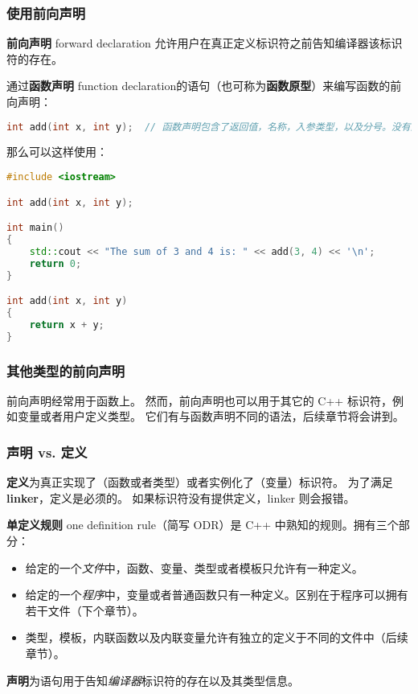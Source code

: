 \documentclass[../../LearnCpp.tex]{subfiles}
\begin{document}

\subsubsection*{使用前向声明}

\textbf{前向声明} forward declaration 允许用户在真正定义标识符之前告知编译器该标识符的存在。

通过\textbf{函数声明} function declaration的语句（也可称为\textbf{函数原型}）来编写函数的前向声明：

\begin{lstlisting}[language=C++]
int add(int x, int y);  // 函数声明包含了返回值，名称，入参类型，以及分号。没有函数体！
\end{lstlisting}

那么可以这样使用：

\begin{lstlisting}[language=C++]
#include <iostream>

int add(int x, int y);

int main()
{
    std::cout << "The sum of 3 and 4 is: " << add(3, 4) << '\n';
    return 0;
}

int add(int x, int y)
{
    return x + y;
}
\end{lstlisting}


\subsubsection*{其他类型的前向声明}

前向声明经常用于函数上。
然而，前向声明也可以用于其它的 C++ 标识符，例如变量或者用户定义类型。
它们有与函数声明不同的语法，后续章节将会讲到。

\subsubsection*{声明 vs. 定义}

\textbf{定义}为真正实现了（函数或者类型）或者实例化了（变量）标识符。
为了满足 \textbf{linker}，定义是必须的。
如果标识符没有提供定义，linker 则会报错。

\textbf{单定义规则} one definition rule（简写 ODR）是 C++ 中熟知的规则。拥有三个部分：

\begin{itemize}
    \item 给定的一个\textit{文件}中，函数、变量、类型或者模板只允许有一种定义。
    \item 给定的一个\textit{程序}中，变量或者普通函数只有一种定义。区别在于程序可以拥有若干文件（下个章节）。
    \item 类型，模板，内联函数以及内联变量允许有独立的定义于不同的文件中（后续章节）。
\end{itemize}

\textbf{声明}为语句用于告知\textit{编译器}标识符的存在以及其类型信息。
\end{document}
